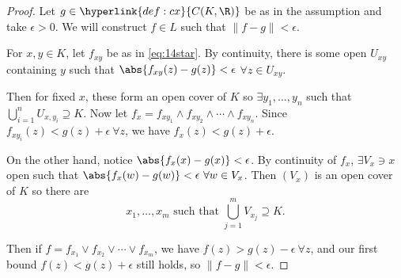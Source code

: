 \documentclass{article}
\begin{document}
\begin{proof}
    Let $g \in \hyperlink{def:cx}{C(K, \R)}$ be as in the assumption and take $\epsilon > 0$.
    We will construct $f \in L$ such that $\|f-g\| < \epsilon$.

    For $x, y \in K$, let $f_{xy}$ be as in \eqref{eq:14star}.
    By continuity, there is some open $U_{xy}$ containing $y$ such that $\abs{f_{xy}(z) - g(z)} < \epsilon$ $\forall z \in U_{xy}$.

    Then for fixed $x$, these form an open cover of $K$ so $\exists y_1, \dotsc, y_n$ such that $\bigcup_{i=1}^n U_{x, y_i} \supseteq K$.
    Now let $f_x = f_{xy_1} \wedge f_{xy_2} \wedge \dotsb \wedge f_{xy_n}$.
    Since $f_{xy_i}(z) < g(z) + \epsilon\ \forall z$, we have $f_x(z) < g(z) + \epsilon$.

    On the other hand, notice $\abs{f_x(x) - g(x)} < \epsilon$.
    By continuity of $f_x$, $\exists V_x \ni x$ open such that $\abs{f_x(w) - g(w)} < \epsilon \ \forall w \in V_x$.
    Then $(V_x)$ is an open cover of $K$ so there are
    \begin{equation*}
        x_1, \dotsc, x_m \text{ such that } \bigcup_{j=1}^m V_{x_j} \supseteq K.
    \end{equation*}

    Then if $f = f_{x_1} \vee f_{x_2} \vee \dotsb \vee f_{x_m}$, we have $f(z) > g(z) - \epsilon \ \forall z$, and our first bound $f(z) < g(z) + \epsilon$ still holds, so $\|f - g\| < \epsilon$. %
\end{proof}
\end{document}
